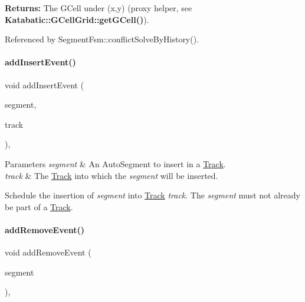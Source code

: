 {\bfseries Returns\+:} The G\+Cell under {\ttfamily }(x,y) (proxy helper, see \textbf{ Katabatic\+::\+G\+Cell\+Grid\+::get\+G\+Cell()}). 

Referenced by Segment\+Fsm\+::conflict\+Solve\+By\+History().

\mbox{\label{classKite_1_1Session_ad4f08dfb62ce626ed72023ce02e7205f}} 
\paragraph{\texorpdfstring{add\+Insert\+Event()}{addInsertEvent()}}
{\footnotesize\ttfamily void add\+Insert\+Event (\begin{DoxyParamCaption}\item[{\mbox{\hyperlink{classKite_1_1TrackElement}{Track\+Element}} $\ast$}]{segment,  }\item[{\mbox{\hyperlink{classKite_1_1Track}{Track}} $\ast$}]{track }\end{DoxyParamCaption})\hspace{0.3cm}{\ttfamily [inline]}, {\ttfamily [static]}}


\begin{DoxyParams}{Parameters}
{\em segment} & An Auto\+Segment to insert in a \mbox{\hyperlink{classKite_1_1Track}{Track}}. \\
\hline
{\em track} & The \mbox{\hyperlink{classKite_1_1Track}{Track}} into which the {\itshape segment} will be inserted.\\
\hline
\end{DoxyParams}
Schedule the insertion of {\itshape segment} into \mbox{\hyperlink{classKite_1_1Track}{Track}} {\itshape track}. The {\itshape segment} must not already be part of a \mbox{\hyperlink{classKite_1_1Track}{Track}}. \mbox{\label{classKite_1_1Session_aedd573fc951ed93f8ada5b0522813c3a}} 
\paragraph{\texorpdfstring{add\+Remove\+Event()}{addRemoveEvent()}}
{\footnotesize\ttfamily void add\+Remove\+Event (\begin{DoxyParamCaption}\item[{\mbox{\hyperlink{classKite_1_1TrackElement}{Track\+Element}} $\ast$}]{segment }\end{DoxyParamCaption})\hspace{0.3cm}{\ttfamily [inline]}, {\ttfamily [static]}}


